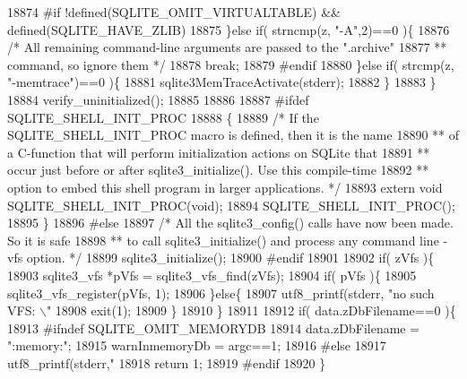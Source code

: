 \begin{DoxyCode}
{{18874 \textcolor{preprocessor}{#if !defined(SQLITE\_OMIT\_VIRTUALTABLE) && defined(SQLITE\_HAVE\_ZLIB)}
18875     \}\textcolor{keywordflow}{else} \textcolor{keywordflow}{if}( strncmp(z, \textcolor{stringliteral}{"-A"},2)==0 )\{
18876       \textcolor{comment}{/* All remaining command-line arguments are passed to the ".archive"}
18877 \textcolor{comment}{      ** command, so ignore them */}
18878       \textcolor{keywordflow}{break};
18879 \textcolor{preprocessor}{#endif}
18880     \}\textcolor{keywordflow}{else} \textcolor{keywordflow}{if}( strcmp(z, \textcolor{stringliteral}{"-memtrace"})==0 )\{
18881       sqlite3MemTraceActivate(stderr);
18882     \}
18883   \}
18884   verify_uninitialized();
18885 
18886 
18887 \textcolor{preprocessor}{#ifdef SQLITE\_SHELL\_INIT\_PROC}
18888   \{
18889     \textcolor{comment}{/* If the SQLITE\_SHELL\_INIT\_PROC macro is defined, then it is the name}
18890 \textcolor{comment}{    ** of a C-function that will perform initialization actions on SQLite that}
18891 \textcolor{comment}{    ** occur just before or after sqlite3\_initialize(). Use this compile-time}
18892 \textcolor{comment}{    ** option to embed this shell program in larger applications. */}
18893     \textcolor{keyword}{extern} \textcolor{keywordtype}{void} SQLITE\_SHELL\_INIT\_PROC(\textcolor{keywordtype}{void});
18894     SQLITE\_SHELL\_INIT\_PROC();
18895   \}
18896 \textcolor{preprocessor}{#else}
18897   \textcolor{comment}{/* All the sqlite3\_config() calls have now been made. So it is safe}
18898 \textcolor{comment}{  ** to call sqlite3\_initialize() and process any command line -vfs option. */}
18899   sqlite3_initialize();
18900 \textcolor{preprocessor}{#endif}
18901 
18902   \textcolor{keywordflow}{if}( zVfs )\{
18903     sqlite3_vfs *pVfs = sqlite3_vfs_find(zVfs);
18904     \textcolor{keywordflow}{if}( pVfs )\{
18905       sqlite3_vfs_register(pVfs, 1);
18906     \}\textcolor{keywordflow}{else}\{
18907       utf8_printf(stderr, \textcolor{stringliteral}{"no such VFS: \(\backslash\)"%
18908       exit(1);
18909     \}
18910   \}
18911 
18912   \textcolor{keywordflow}{if}( data.zDbFilename==0 )\{
18913 \textcolor{preprocessor}{#ifndef SQLITE\_OMIT\_MEMORYDB}
18914     data.zDbFilename = \textcolor{stringliteral}{":memory:"};
18915     warnInmemoryDb = argc==1;
18916 \textcolor{preprocessor}{#else}
18917     utf8_printf(stderr,\textcolor{stringliteral}{"%
18918     \textcolor{keywordflow}{return} 1;
18919 \textcolor{preprocessor}{#endif}
18920   \}
}}}}
\end{DoxyCode}
